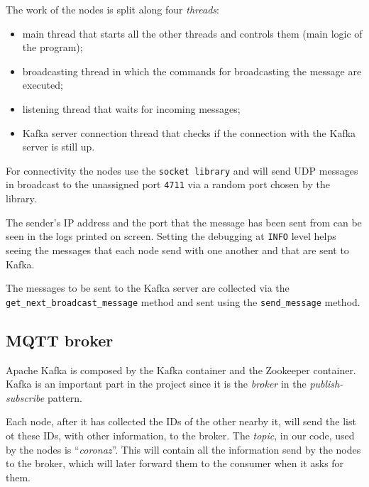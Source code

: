 \documentclass[conference]{IEEEtran}
\begin{document}
		The work of the nodes is split along four \textit{threads}:
		\begin{itemize}
			\item main thread that starts all the other threads and controls them (main logic of the program);
			\item broadcasting thread in which the commands for broadcasting the message are executed;
			\item listening thread that waits for incoming messages;
			\item Kafka server connection thread that checks if the connection with the Kafka server is still up.
		\end{itemize}
		
		For connectivity the nodes use the \texttt{socket library} and will send UDP messages in broadcast to the unassigned port \texttt{4711} via a random port chosen by the library.
		
		The sender's IP address and the port that the message has been sent from can be seen in the logs printed on screen.
		Setting the debugging at \texttt{INFO} level helps seeing the messages that each node send with one another and that are sent to Kafka.
		
		The messages to be sent to the Kafka server are collected via the \texttt{get\_next\_broadcast\_message} method and sent using the \texttt{send\_message} method.
	
	
	\subsection{MQTT broker}	
	
		Apache Kafka is composed by the Kafka container and the Zookeeper container.
		Kafka is an important part in the project since it is the \textit{broker} in the \textit{publish-subscribe} pattern.
		
		Each node, after it has collected the IDs of the other nearby it, will send the list ot these IDs, with other information, to the broker.
		The \textit{topic}, in our code, used by the nodes is ``\textit{coronaz}''.
		This will contain all the information send by the nodes to the broker, which will later forward them to the consumer when it asks for them.
		
\end{document}
